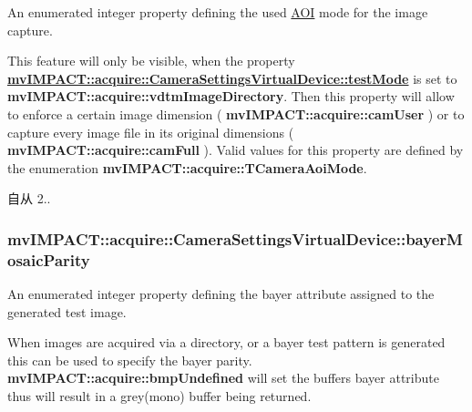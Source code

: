 An enumerated integer property defining the used \hyperlink{struct_a_o_i}{A\+O\+I} mode for the image capture. 

This feature will only be visible, when the property {\bfseries \hyperlink{classmv_i_m_p_a_c_t_1_1acquire_1_1_camera_settings_virtual_device_a804a5ef868aaf896d39986547d8407f6}{mv\+I\+M\+P\+A\+C\+T\+::acquire\+::\+Camera\+Settings\+Virtual\+Device\+::test\+Mode}} is set to {\bfseries mv\+I\+M\+P\+A\+C\+T\+::acquire\+::vdtm\+Image\+Directory}. Then this property will allow to enforce a certain image dimension ( {\bfseries mv\+I\+M\+P\+A\+C\+T\+::acquire\+::cam\+User} ) or to capture every image file in its original dimensions ( {\bfseries mv\+I\+M\+P\+A\+C\+T\+::acquire\+::cam\+Full} ). Valid values for this property are defined by the enumeration {\bfseries mv\+I\+M\+P\+A\+C\+T\+::acquire\+::\+T\+Camera\+Aoi\+Mode}.

\begin{DoxySince}{自从}
2.. 
\end{DoxySince}
\hypertarget{classmv_i_m_p_a_c_t_1_1acquire_1_1_camera_settings_virtual_device_a869a0aa796304b7c181fce9ff7a6abec}{
\subsubsection[{bayer\+Mosaic\+Parity}]{ mv\+I\+M\+P\+A\+C\+T\+::acquire\+::\+Camera\+Settings\+Virtual\+Device\+::bayer\+Mosaic\+Parity}}\label{classmv_i_m_p_a_c_t_1_1acquire_1_1_camera_settings_virtual_device_a869a0aa796304b7c181fce9ff7a6abec}


An enumerated integer property defining the bayer attribute assigned to the generated test image. 

When images are acquired via a directory, or a bayer test pattern is generated this can be used to specify the bayer parity. {\bfseries mv\+I\+M\+P\+A\+C\+T\+::acquire\+::bmp\+Undefined} will set the buffers bayer attribute thus will result in a grey(mono) buffer being returned.

